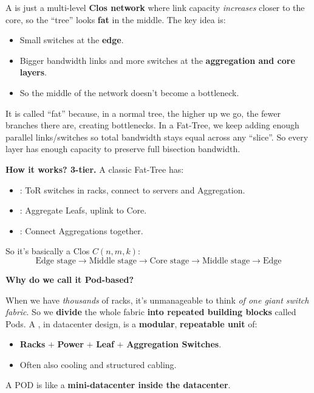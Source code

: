 \highspace
A  is just a multi-level \textbf{Clos network} where link capacity \emph{increases} closer to the core, so the ``tree'' looks \textbf{fat} in the middle. The key idea is:
\begin{itemize}
    \item Small switches at the \textbf{edge}.
    \item Bigger bandwidth links and more switches at the \textbf{aggregation and core layers}.
    \item So the middle of the network doesn't become a bottleneck.
\end{itemize}
It is called ``fat'' because, in a normal tree, the higher up we go, the fewer branches there are, creating bottlenecks. In a Fat-Tree, we keep adding enough parallel links/switches so total bandwidth stays equal across any ``slice''. So every layer has enough capacity to preserve full bisection bandwidth.

\highspace
\textcolor{Green3}{ \textbf{How it works? 3-tier.}} A classic Fat-Tree has:
\begin{itemize}
    \item {}: ToR switches in racks, connect to servers and Aggregation.
    \item {}: Aggregate Leafs, uplink to Core.
    \item {}: Connect Aggregations together.
\end{itemize}
So it's basically a Clos $C(n,m,k)$:
\begin{equation*}
    \text{Edge stage} \rightarrow \text{Middle stage} \rightarrow \text{Core stage} \rightarrow \text{Middle stage} \rightarrow \text{Edge}
\end{equation*}

\highspace
\begin{flushleft}
    \textcolor{Green3}{ \textbf{Why do we call it Pod-based?}}
\end{flushleft}
When we have \emph{thousands} of racks, it's unmanageable to think \emph{of one giant switch fabric}. So we \textbf{divide} the whole fabric \textbf{into repeated building blocks} called Pods. A , in datacenter design, is a \textbf{modular}, \textbf{repeatable unit} of:
\begin{itemize}
    \item \textbf{Racks} $+$ \textbf{Power} $+$ \textbf{Leaf} $+$ \textbf{Aggregation Switches}.
    \item Often also cooling and structured cabling.
\end{itemize}
A POD is like a \textbf{mini-datacenter inside the datacenter}.

